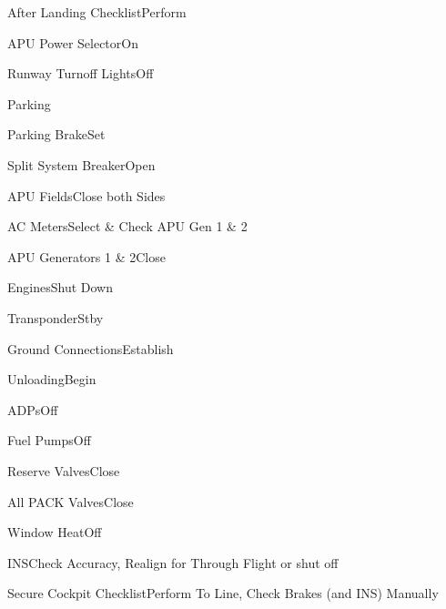 \documentclass[sim-use, blue_items]{checklist}
\begin{document}
\begin{continuedchecklist}
	\item{After Landing Checklist}{Perform}
	\item{APU Power Selector}{On}
	 {
		\item{Runway Turnoff Lights}{Off}
	}
\end{continuedchecklist}

\begin{checklist}{Parking}
	\item{Parking Brake}{Set}
	\item{Split System Breaker}{Open}
	\item{APU Fields}{Close both Sides}
	\item{AC Meters}{Select \& Check APU Gen 1 \& 2}
	\item{APU Generators 1 \& 2}{Close}
	\item{Engines}{Shut Down}
	\item{Transponder}{Stby}
	\item{Ground Connections}{Establish}
	\item{Unloading}{Begin}
	\item{ADPs}{Off}
	\item{Fuel Pumps}{Off}
	\item{Reserve Valves}{Close}
	 {
		\item{All PACK Valves}{Close}
	}
	\item{Window Heat}{Off}
	\item{INS}{Check Accuracy, Realign for Through Flight or shut off}
	\item{Secure Cockpit Checklist}{Perform To Line, Check Brakes (and INS) Manually}
\end{checklist}
\end{document}
